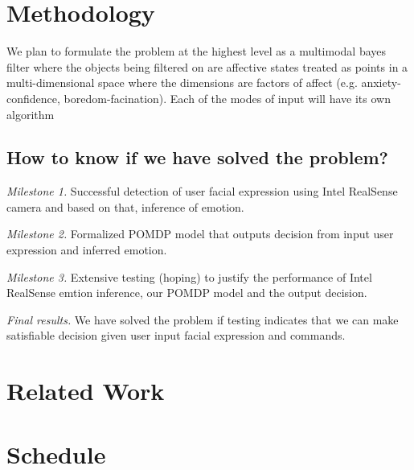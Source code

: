 \documentclass[12pt,letterpaper]{article}
\begin{document}
\section{Methodology}
We plan to formulate the problem at the highest level as a multimodal bayes filter where the objects being filtered on are affective states treated as points in a multi-dimensional space where the dimensions are factors of affect (e.g. anxiety-confidence, boredom-facination).  Each of the modes of input will have its own algorithm


\subsection{How to know if we have solved the problem?}
\emph{Milestone 1.} Successful detection of user facial expression using Intel RealSense camera and based on that, inference of emotion.

\emph{Milestone 2.} Formalized POMDP model that outputs decision from input user expression and inferred emotion.

\emph{Milestone 3.} Extensive testing (hoping) to justify the performance of Intel RealSense emtion inference, our POMDP model and the output decision.

\emph{Final results.} We have solved the problem if testing indicates that we can make satisfiable decision given user input facial expression and commands. 
\section{Related Work}



\newpage
\section{Schedule}
\end{document}
